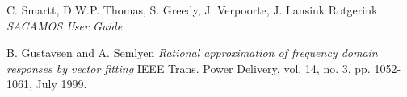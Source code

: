 \begin{thebibliography}{9}

C. Smartt, D.W.P. Thomas, S. Greedy, J. Verpoorte, J. Lansink Rotgerink
\textsl{SACAMOS User Guide}

B. Gustavsen and A. Semlyen
\textsl{Rational approximation of frequency domain responses by vector fitting}
IEEE Trans. Power Delivery, vol. 14, no. 3, pp. 1052-1061, July 1999.

\end{thebibliography}



